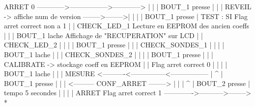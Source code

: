 \begin{DoxyPre}                     ARRET 0 ------------>----------------->------------>
                        |                                                |
                        | BOUT\_1 presse                                  |
                        |                                                |
                     REVEIL  -> affiche num de version -------->-------->|
                        |                                                |
                        | BOUT\_1 presse                                  | TEST : SI Flag arret correct non a 1
                        |                                                |
                     CHECK\_LED\_1                                       Lecture en EEPROM des ancien coeffs
                        |                                                |
                        | BOUT\_1 lache                                 Affichage de "RECUPERATION" sur LCD
                        |                                                |
                     CHECK\_LED\_2                                         |
                        |                                                |
                        | BOUT\_1 presse                                  |  
                        |                                                |
                     CHECK\_SONDES\_1                                      |
                        |                                                |
                        | BOUT\_1 lache                                   |
                        |                                                |
                     CHECK\_SONDES\_2                                      |
                        |                                                |
                        | BOUT\_1 presse                                  |
                        |                                                |
                     CALIBRATE -> stockage coeff en EEPROM               |
                        |         Flag arret correct 0                   |
                        |                                                |
                        | BOUT\_1 lache                                   |
                        |                                                |
                     MESURE <----------<---------------<-----------------
                        |                                                ^
                        | BOUT\_1 presse                                  |
                        |                                                |
       <--------- CONF\_ARRET -------->                                   |
      |                               |                                  ^
      | BOUT\_2 presse                 | tempo 5 secondes                 |
      |                               |                                  |
    ARRET Flag arret correct 1        ------------->----------->-------->
*\end{DoxyPre}
 

